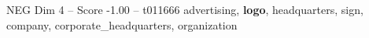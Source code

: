 \begin{textsample}{NEG Dim 4 – Score -1.00 – t011666}  \label{ex:f4_neg_023}
advertising, \textbf{logo}, headquarters, sign, company, corporate\_headquarters, organization

\end{textsample}

